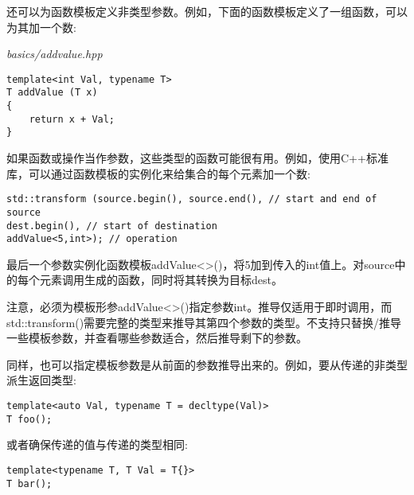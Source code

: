 还可以为函数模板定义非类型参数。例如，下面的函数模板定义了一组函数，可以为其加一个数:

\noindent
\textit{basics/addvalue.hpp}
\begin{lstlisting}[style=styleCXX]
template<int Val, typename T>
T addValue (T x)
{
	return x + Val;
}
\end{lstlisting}

如果函数或操作当作参数，这些类型的函数可能很有用。例如，使用C++标准库，可以通过函数模板的实例化来给集合的每个元素加一个数:

\begin{lstlisting}[style=styleCXX]
std::transform (source.begin(), source.end(), // start and end of source
dest.begin(), // start of destination
addValue<5,int>); // operation
\end{lstlisting}

最后一个参数实例化函数模板addValue<>()，将5加到传入的int值上。对source中的每个元素调用生成的函数，同时将其转换为目标dest。

注意，必须为模板形参addValue<>()指定参数int。推导仅适用于即时调用，而std::transform()需要完整的类型来推导其第四个参数的类型。不支持只替换/推导一些模板参数，并查看哪些参数适合，然后推导剩下的参数。

同样，也可以指定模板参数是从前面的参数推导出来的。例如，要从传递的非类型派生返回类型:

\begin{lstlisting}[style=styleCXX]
template<auto Val, typename T = decltype(Val)>
T foo();
\end{lstlisting}

或者确保传递的值与传递的类型相同:

\begin{lstlisting}[style=styleCXX]
template<typename T, T Val = T{}>
T bar();
\end{lstlisting}































